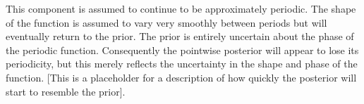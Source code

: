 This component is assumed to continue to be approximately periodic.
The shape of the function is assumed to vary very smoothly between periods but will eventually return to the prior.
The prior is entirely uncertain about the phase of the periodic function.
Consequently the pointwise posterior will appear to lose its periodicity, but this merely reflects the uncertainty in the shape and phase of the function.
[This is a placeholder for a description of how quickly the posterior will start to resemble the prior].